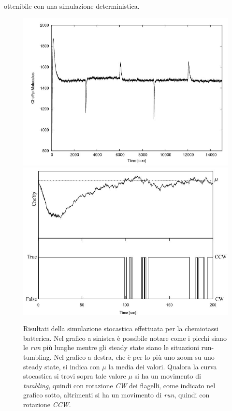 \documentclass[a4paper,12pt, oneside]{book}
\begin{document}
ottenibile con una simulazione deterministica.
\begin{figure}
  \centering
  \includegraphics[scale = 0.23]{img/noise5.jpg}
  \includegraphics[scale = 0.23]{img/noise6.jpg}
  \label{fig:noises}
  \caption{Risultati della simulazione stocastica effettuata per la chemiotassi
    batterica. Nel grafico a sinistra è possibile notare come i picchi siano le
    \textit{run} 
    più lunghe mentre gli steady state siano le situazioni run-tumbling. Nel
    grafico a destra, che è per lo più uno zoom su uno steady state, si indica
    con $\mu$ la media dei valori. Qualora la curva stocastica si trovi sopra
    tale valore $\mu$ si ha un movimento di \textit{tumbling}, quindi con
    rotazione \textit{CW} dei flagelli, come indicato nel grafico sotto,
    altrimenti si ha un movimento di \textit{run}, quindi con rotazione
    \textit{CCW}.}      
\end{figure}
\end{document}
